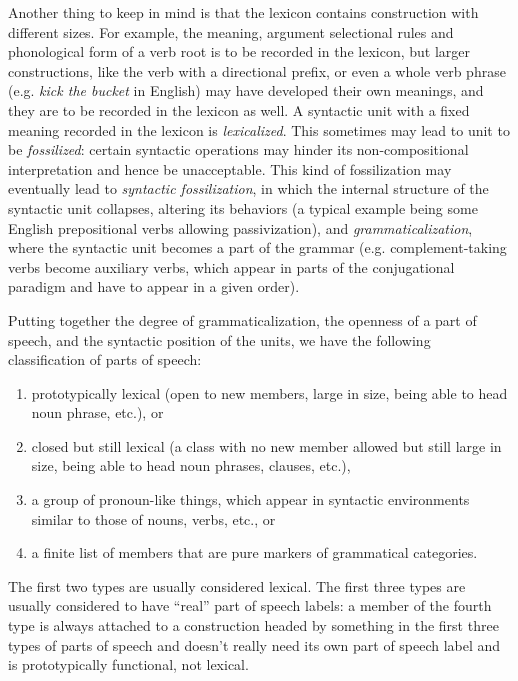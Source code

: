 \documentclass[a4paper, oneside, 12pt]{report}
\newcommand{\form}[1]{\emph{#1}}
\begin{document}
Another thing to keep in mind is that the lexicon contains
construction with different sizes.
For example, the meaning, argument selectional rules and phonological form of a verb root
is to be recorded in the lexicon,
but larger constructions, like the verb with a directional prefix,
or even a whole verb phrase (e.g. \form{kick the bucket} in English)
may have developed their own meanings,
and they are to be recorded in the lexicon as well.
A syntactic unit with a fixed meaning recorded in the lexicon is \emph{lexicalized}.
This sometimes may lead to unit to be \emph{fossilized}:
certain syntactic operations may hinder its non-compositional interpretation 
and hence be unacceptable.
This kind of fossilization may eventually lead to \emph{syntactic fossilization},
in which the internal structure of the syntactic unit collapses,
altering its behaviors
(a typical example being some English prepositional verbs allowing passivization),
and \emph{grammaticalization},
where the syntactic unit becomes a part of the grammar 
(e.g. complement-taking verbs become auxiliary verbs,
which appear in parts of the conjugational paradigm and have to appear in a given order).

Putting together the degree of grammaticalization,
the openness of a part of speech,
and the syntactic position of the units,
we have the following classification of parts of speech:
\begin{enumerate}
    \item prototypically lexical 
    (open to new members, large in size, being able to head noun phrase, etc.), or
    \item closed but still lexical 
    (a class with no new member allowed but still large in size, being able to head noun phrases, clauses, etc.),
    \item a group of pronoun-like things, which appear in syntactic environments similar to those of nouns, verbs, etc., or
    \item a finite list of members that are pure markers of grammatical categories.
\end{enumerate}
The first two types are usually considered lexical.
The first three types are usually considered to have 
``real'' part of speech labels: 
a member of the fourth type is always attached to a construction headed by 
something in the first three types of parts of speech
and doesn't really need its own part of speech label and is prototypically functional, not lexical.
\end{document}
